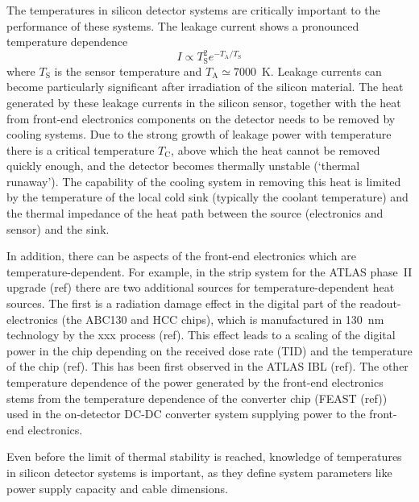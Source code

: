 The temperatures in silicon detector systems are critically important to the performance of these systems. The leakage current shows a pronounced temperature dependence 
\begin{equation}
I\propto T_\text{S}^2e^{-T_\text{A}/T_\text{S}}
\end{equation}
where $T_\text{S}$ is the sensor temperature and $T_\text{A}\simeq7000$~K. Leakage currents can become particularly significant after irradiation of the silicon material. The heat generated by these leakage currents in the silicon sensor, together with the heat from front-end electronics components on the detector needs to be removed by cooling systems. Due to the strong growth of leakage power with temperature there is a critical temperature $T_\text{C}$, above which the heat cannot be removed quickly enough, and the detector becomes thermally unstable (`thermal runaway'). The capability of the cooling system in removing this heat is limited by the temperature of the local cold sink (typically the coolant temperature) and the thermal impedance of the heat path between the source (electronics and sensor) and the sink.

In addition, there can be aspects of the front-end electronics which are temperature-dependent. For example, in the strip system for the ATLAS phase~II upgrade (ref) there are two additional sources for temperature-dependent heat sources. The first is a radiation damage effect in the digital part of the readout-electronics (the ABC130 and HCC chips), which is manufactured in 130~nm technology by the xxx process (ref). This effect leads to a scaling of the digital power in the chip depending on the received dose rate (TID) and the temperature of the chip (ref). This has been first observed in the ATLAS IBL (ref). The other temperature dependence of the power generated by the front-end electronics stems from the temperature dependence of the converter chip (FEAST (ref)) used in the on-detector DC-DC converter system supplying power to the front-end electronics. 

Even before the limit of thermal stability is reached, knowledge of temperatures in silicon detector systems is important, as they define system parameters like power supply capacity and cable dimensions.

